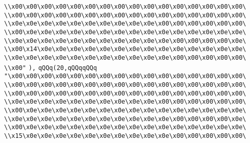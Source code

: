 \verb|\\x00\x00\x00\x00\x00\x00\x00\x00\x00\x00\x00\x00\x00\x00\x00\x00\|\newline
\verb|\\x00\x00\x00\x00\x00\x00\x00\x00\x00\x00\x00\x00\x00\x00\x00\x00\|\newline
\verb|\\x0e\x0e\x0e\x0e\x0e\x0e\x0e\x0e\x0e\x0e\x00\x00\x00\x00\x00\x00\|\newline
\verb|\\x00\x0e\x0e\x0e\x0e\x0e\x0e\x0e\x0e\x0e\x0e\x0e\x0e\x0e\x0e\x0e\|\newline
\verb|\\x0e\x0e\x0e\x0e\x0e\x0e\x0e\x0e\x0e\x0e\x0e\x00\x00\x00\x00\x0e\|\newline
\verb|\\x00\x14\x0e\x0e\x0e\x0e\x0e\x0e\x0e\x0e\x0e\x0e\x0e\x0e\x0e\x0e\|\newline
\verb|\\x0e\x0e\x0e\x0e\x0e\x0e\x0e\x0e\x0e\x0e\x0e\x00\x00\x00\x00\x00\|\newline
\verb|\\x00"|\newline
\verb|),|\newline
\verb|qQQq(20,qQQqqQQq|\newline
\verb|"\x00\x00\x00\x00\x00\x00\x00\x00\x00\x00\x00\x00\x00\x00\x00\x00\|\newline
\verb|\\x00\x00\x00\x00\x00\x00\x00\x00\x00\x00\x00\x00\x00\x00\x00\x00\|\newline
\verb|\\x00\x00\x00\x00\x00\x00\x00\x00\x00\x00\x00\x00\x00\x00\x00\x00\|\newline
\verb|\\x0e\x0e\x0e\x0e\x0e\x0e\x0e\x0e\x0e\x0e\x00\x00\x00\x00\x00\x00\|\newline
\verb|\\x00\x0e\x0e\x0e\x0e\x0e\x0e\x0e\x0e\x0e\x0e\x0e\x0e\x0e\x0e\x0e\|\newline
\verb|\\x0e\x0e\x0e\x0e\x0e\x0e\x0e\x0e\x0e\x0e\x0e\x00\x00\x00\x00\x0e\|\newline
\verb|\\x00\x0e\x0e\x0e\x0e\x0e\x0e\x0e\x0e\x0e\x0e\x0e\x0e\x0e\x0e\x0e\|\newline
\verb|\\x15\x0e\x0e\x0e\x0e\x0e\x0e\x0e\x0e\x0e\x0e\x00\x00\x00\x00\x00\|\newline

